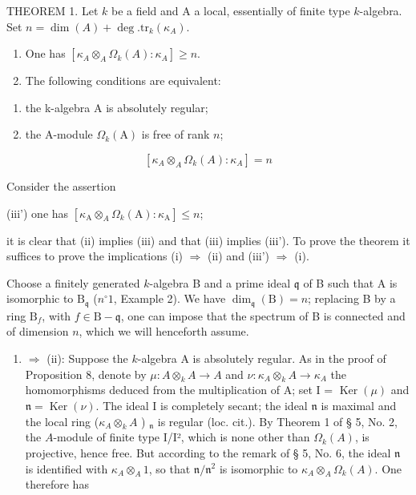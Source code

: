 THEOREM 1. Let \(k\) be a field and A a local, essentially of finite type \(k\)-algebra. Set \(n = \dim(A) + \deg.\mathrm{tr}_{k}(\kappa_{A})\).

\begin{enumerate}
\def\labelenumi{\alph{enumi})}
\item
  One has \([\kappa_{A} \otimes_{A} \Omega_k(A): \kappa_{A}] \geqslant n\).
\item
  The following conditions are equivalent:
\end{enumerate}

\begin{enumerate}
\def\labelenumi{(\roman{enumi})}
\item
  the k-algebra A is absolutely regular;
\item
  the A-module \(\Omega_{k}(\mathrm{A})\) is free of rank \(n\);
\end{enumerate}

\[
\left[ \kappa_ {A} \otimes_ {A} \Omega_ {k} (A): \kappa_ {A} \right] = n
\]

Consider the assertion

(iii') one has \([\kappa_{\mathrm{A}} \otimes_{A} \Omega_k(\mathrm{A}):\kappa_{\mathrm{A}}] \leqslant n\);

it is clear that (ii) implies (iii) and that (iii) implies (iii'). To prove the theorem it suffices to prove the implications (i) \(\Rightarrow\) (ii) and (iii') \(\Rightarrow\) (i).

Choose a finitely generated \(k\)-algebra B and a prime ideal \(\mathfrak{q}\) of B such that A is isomorphic to \(\mathrm{B}_{\mathfrak{q}}\) (\(n^{\circ} 1\), Example 2). We have \(\dim_{\mathfrak{q}}(\mathrm{B}) = n\); replacing B by a ring \(\mathrm{B}_f\), with \(f \in \mathrm{B} - \mathfrak{q}\), one can impose that the spectrum of B is connected and of dimension \(n\), which we will henceforth assume.

\begin{enumerate}
\def\labelenumi{(\roman{enumi})}
\tightlist
\item
  \(\Rightarrow\) (ii): Suppose the \(k\)-algebra A is absolutely regular. As in the proof of Proposition 8, denote by \(\mu : A \otimes_k A \to A\) and \(\nu : \kappa_A \otimes_k A \to \kappa_A\) the homomorphisms deduced from the multiplication of A; set I = \(\operatorname{Ker}(\mu)\) and \(\mathfrak{n} = \operatorname{Ker}(\nu)\). The ideal I is completely secant; the ideal \(\mathfrak{n}\) is maximal and the local ring (\(\kappa_A \otimes_k A\) ) \(_{\mathfrak{n}}\) is regular (loc. cit.). By Theorem 1 of § 5, No. 2, the \(A\)-module of finite type I/I², which is none other than \(\Omega_k(A)\), is projective, hence free. But according to the remark of § 5, No. 6, the ideal \(\mathfrak{n}\) is identified with \(\kappa_A \otimes_A 1\), so that \(\mathfrak{n}/\mathfrak{n}^2\) is isomorphic to \(\kappa_A \otimes_A \Omega_k(A)\). One therefore has
\end{enumerate}

